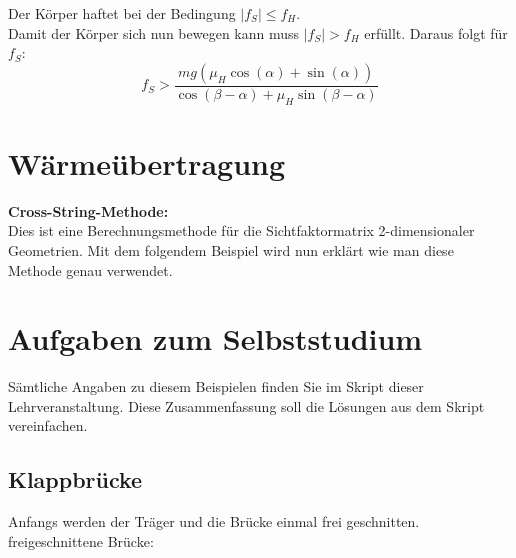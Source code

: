 \documentclass[a4paper,12p]{article}
\begin{document}
\newline
Der Körper haftet bei der Bedingung \( |f_{S}|\leq f_{H}\).\\
Damit der Körper sich nun bewegen kann muss \(|f_{S}| > f_{H}\) erfüllt. Daraus folgt für \(f_{S}\):
\[
	f_{S} > \frac{mg(\mu_{H}\cos(\alpha) + \sin(\alpha))}{\cos(\beta - \alpha) + \mu_{H}\sin(\beta - \alpha)}
\] 

\section{Wärmeübertragung}
\textbf{Cross-String-Methode:} \\
Dies ist eine Berechnungsmethode für die Sichtfaktormatrix 2-dimensionaler Geometrien. Mit dem folgendem Beispiel wird nun erklärt wie man diese Methode genau verwendet. \\


\renewcommand\thesection{\Alph{section}} %
\setcounter{section}{1} %
\section{Aufgaben zum Selbststudium}
Sämtliche Angaben zu diesem Beispielen finden Sie im Skript dieser Lehrveranstaltung. Diese Zusammenfassung soll die Lösungen aus dem Skript vereinfachen.
\newpage
\subsection{Klappbrücke}
Anfangs werden der Träger und die Brücke einmal frei geschnitten.
freigeschnittene Brücke: \\
\end{document}
